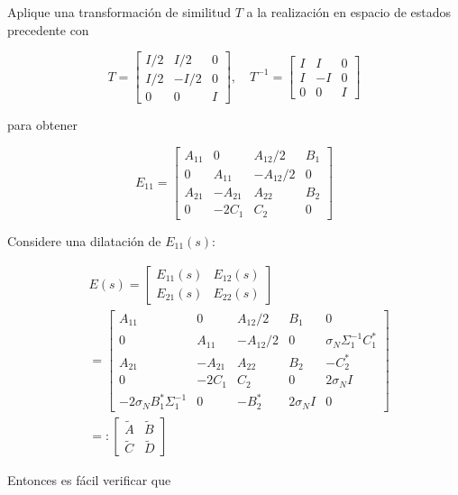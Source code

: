 Aplique una transformación de similitud $T$ a la realización en espacio de estados precedente con

$$
T=\left[\begin{array}{ccc}
I / 2 & I / 2 & 0 \\
I / 2 & -I / 2 & 0 \\
0 & 0 & I
\end{array}\right], \quad T^{-1}=\left[\begin{array}{ccc}
I & I & 0 \\
I & -I & 0 \\
0 & 0 & I
\end{array}\right]
$$

para obtener

$$
E_{11}=\left[\begin{array}{ccc|c}
A_{11} & 0 & A_{12} / 2 & B_{1} \\
0 & A_{11} & -A_{12} / 2 & 0 \\
A_{21} & -A_{21} & A_{22} & B_{2} \\
\hline 0 & -2 C_{1} & C_{2} & 0
\end{array}\right]
$$

Considere una dilatación de $E_{11}(s)$:

$$
\begin{aligned}
& E(s)=\left[\begin{array}{ll}
E_{11}(s) & E_{12}(s) \\
E_{21}(s) & E_{22}(s)
\end{array}\right] \\
& =\left[\begin{array}{ccc|cc}
A_{11} & 0 & A_{12} / 2 & B_{1} & 0 \\
0 & A_{11} & -A_{12} / 2 & 0 & \sigma_{N} \Sigma_{1}^{-1} C_{1}^{*} \\
A_{21} & -A_{21} & A_{22} & B_{2} & -C_{2}^{*} \\
\hline 0 & -2 C_{1} & C_{2} & 0 & 2 \sigma_{N} I \\
-2 \sigma_{N} B_{1}^{*} \Sigma_{1}^{-1} & 0 & -B_{2}^{*} & 2 \sigma_{N} I & 0
\end{array}\right] \\
& =:\left[\begin{array}{c|c}
\tilde{A} & \tilde{B} \\
\hline \tilde{C} & \tilde{D}
\end{array}\right]
\end{aligned}
$$

Entonces es fácil verificar que

